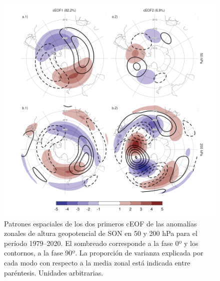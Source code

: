\documentclass[12pt,oneside,a4paper]{reedthesis}
\begin{document}
\begin{figure}

{\centering \includegraphics{figures/20-ceofs/ceofs-1-1} 

}

\caption{Patrones espaciales de los dos primeros cEOF de las anomalías zonales de altura geopotencial de SON en 50 y 200 hPa para el período 1979--2020. El sombreado corresponde a la fase 0º y los contornos, a la fase 90º. La proporción de varianza explicada por cada modo con respecto a la media zonal está indicada entre paréntesis. Unidades arbitrarias.}\label{fig:ceofs-1}
\end{figure}
\end{document}
